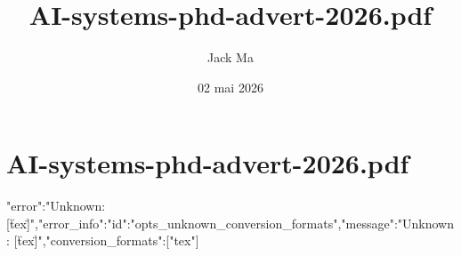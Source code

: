 \documentclass[12pt,a4paper]{article}
\title{AI-systems-phd-advert-2026.pdf}
\author{Jack Ma}
\date{02 mai 2026}
\begin{document}
\maketitle

\section*{AI-systems-phd-advert-2026.pdf}
{"error":"Unknown: [\"tex\"]","error_info":{"id":"opts_unknown_conversion_formats","message":"Unknown: [\"tex\"]","conversion_formats":["tex"]}}
\end{document}
